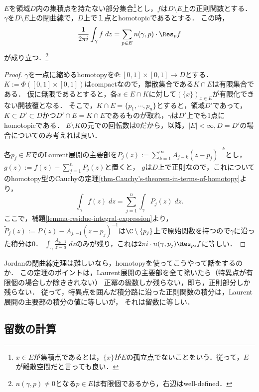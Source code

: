 \documentclass[uplatex, dvipdfmx]{jsreport}
\begin{document}
\begin{theorem}[Homotopy型の留数定理]\label{thm-residue-in-terms-of-homotopy}
    $E$を領域$D$内の集積点を持たない部分集合\footnote{$x\in E$が集積点であるとは，$\{x\}$が$E$の孤立点でないことをいう．従って，$E$が離散空間だと言っても良い．}とし，$f$は$D\setminus E$上の正則関数とする．
    $\gamma$を$D\setminus E$上の閉曲線で，$D$上で１点とhomotopicであるとする．
    この時，
    \[\frac{1}{2\pi i}\int_\gamma f\;dz=\sum_{p\in E}n(\gamma,p)\cdot\Res_pf\]
    が成り立つ．\footnote{$n(\gamma,p)\ne 0$となる$p\in E$は有限個であるから，右辺はwell-defined．}
\end{theorem}
\begin{proof}
    $\gamma$を一点に縮めるhomotopyを$\Phi:[0,1]\times[0,1]\to D$とする．
    $K:=\Phi([0,1]\times[0,1])$はcompactなので，離散集合である$K\cap E$は有限集合である．
    仮に無限であるとすると，各$x\in E\cap K$に対して$(\{x\})_{x\in E}$が有限化できない開被覆となる．
    そこで，$K\cap E=\{p_1,\cdots,p_n\}$とすると，領域$D'$であって，$K\subset D'\subset D$かつ$D'\cap E=K\cap E$であるものが取れ，$\gamma$は$D'$上でも1点にhomotopicである．
    $E\setminus K$の元での回転数は$0$だから，以降，$|E|<\infty,D=D'$の場合についてのみ考えれば良い．

    各$p_j\in E$でのLaurent展開の主要部を$P_j(z):=\sum^\infty_{k=1}A_{j-k}(z-p_j)^{-k}$とし，$g(z):=f(z)-\sum^n_{j=1}P_j(z)$と置くと，
    $g$は$D$上で正則なので，これについてのhomotopy型のCauchyの定理\ref{thm-Cauchy's-theorem-in-terms-of-homotopy}より，
    \[\int_\gamma f(z)\;dz=\sum^n_{j=1}\int_\gamma P_j(z)\;dz.\]
    ここで，補題\ref{lemma-residue-integral-expression}より，$\widetilde{P}_j(z):=P(z)-A_{j,-1}(z-p_j)^{-1}$は$\C\setminus\{p_j\}$上で原始関数を持つので$\gamma$に沿った積分は$0$．
    $\int_\gamma\frac{A_{j,-1}}{z-a}\;dz$のみが残り，これは$2\pi i\cdot n(\gamma,p_j)\Res_{p_j}f$に等しい．
\end{proof}
\begin{remarks}
    Jordanの閉曲線定理は難しいなら，homotopyを使ってこうやって話をするのか．
    この定理のポイントは，Laurent展開の主要部を全て除いたら（特異点が有限個の場合しか除ききれない）
    正冪の級数しか残らない，即ち，正則部分しか残らない．
    従って，特異点を囲んだ積分路に沿った正則関数の積分は，Laurent展開の主要部の積分の値に等しいが，
    それは留数に等しい．
\end{remarks}

\subsection{留数の計算}
\end{document}
